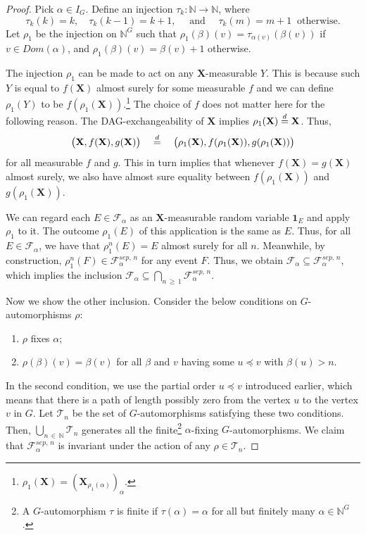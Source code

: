 \documentclass[AHL,Unicode,longabstracts,published]{cedram}
\newcommand{\alf}{\alpha}%
\newcommand*\bb{\beta}
\newcommand*{\sep}{\mathit{sep}}
\renewcommand{\d}{\buildrel{d}\over{=}}
\newcommand*\dom{\mathit{Dom}}
\newcommand*\N{\mathbb{N}}
\newcommand*\FF{\mathcal{F}}
\newcommand*\TT{\mathcal{T}}
\newcommand*\bX{\mathbf{X}}
\newcommand*\N{\mathbb{N}}
\begin{document}
\begin{proof}
Pick $\alpha \in I_G$. Define an injection $\tau_k: \N \to \N$, where
\[
\tau_k(k)=k, \quad \tau_k(k-1)=k+1,\quad \text{ and }\quad \tau_k(m)=m+1 \ \text{ otherwise}.
\]
Let $\rho_1$ be the injection on $\N^G$ such that $\rho_1(\bb)(v)=\tau_{\alf(v)}(\bb(v))$ if $v \in \dom(\alf)$, and $\rho_1(\bb)(v)=\bb(v)+1$ otherwise.

The injection $\rho_1$ can be made to act on any $\bX$-measurable $Y$. This is because such $Y$ is equal to $f(\bX)$ almost surely for some measurable $f$ and we can define $\rho_1(Y)$ to be $f(\rho_1(\bX))$.\footnote{$\rho_1(\bX) = (\bX_{\rho_1(\alpha)})_\alpha$.} The choice of $f$ does not matter here for the following reason. The DAG-exchangeability of $\bX$ implies $\rho_1(\bX) \d \bX$. Thus,
\[
\big(\bX,f(\bX),g(\bX)\big)\quad\d \quad\big(\rho_1(\bX),f(\rho_1(\bX)),g(\rho_1(\bX))\big)
\]
for all measurable $f$ and $g$. This in turn implies that whenever $f(\bX) = g(\bX)$ almost surely, we also have almost sure equality between $f(\rho_1(\bX))$ and $g(\rho_1(\bX))$.

We can regard each $E \in \FF_\alf$ as an $\bX$-measurable random variable $\mathbf{1}_E$ and apply $\rho_1$ to it. The outcome $\rho_1(E)$ of this application is the same as $E$. Thus, for all $E \in \FF_\alf$, we have that $\rho^n_1(E) = E$ almost surely for all $n$. Meanwhile, by construction, $\rho_1^n (F) \in \mathcal{F}^{\sep,\,n}_\alf$ for any event $F$. Thus, we obtain $\FF_\alf \subseteq \mathcal{F}^{\sep,\,n}_\alf$, which implies the inclusion $\FF_\alf \subseteq \bigcap_{n\,\geq\,1} \mathcal{F}^{\sep,\,n}_\alf$.

Now we show the other inclusion. Consider the below conditions on $G$-automor\-phisms $\rho$:
\begin{enumerate}
\item $\rho$ fixes $\alf$;
\item $\rho(\bb)(v)=\bb(v)$ for all $\bb$ and $v$ having some $u \preceq v$ with $\bb(u)>n$.
\end{enumerate}
In the second condition, we use the partial order $u \preceq v$ introduced earlier, which means that there is a path of length possibly zero from the vertex $u$ to the vertex $v$ in $G$. Let $\TT_n$ be the set of $G$-automorphisms satisfying these two conditions. Then, $\bigcup_{n\,\in\,\N}\TT_n$ generates all the finite\footnote{A $G$-automorphism $\tau$ is finite if $\tau(\alf)=\alf$ for all but finitely many $\alf \in \N^G$.} $\alf$-fixing $G$-automorphisms. We claim that $\mathcal{F}^{\sep,\,n}_\alf$ is invariant under the action of any $\rho\in \TT_n$.


\end{proof}
\end{document}
